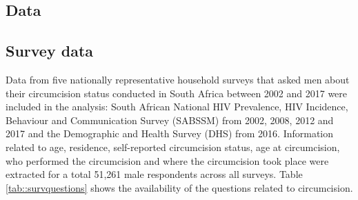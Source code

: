 \documentclass{article}
\begin{document}
\begin{appendix}

\section{Data}


\subsection{Survey data}


\noindent Data from five nationally representative household surveys that asked men about their circumcision status conducted in South Africa between 2002 and 2017 were included in the analysis: South African National HIV Prevalence, HIV Incidence, Behaviour and Communication Survey (SABSSM) from 2002, 2008, 2012 and 2017 and the Demographic and Health Survey (DHS) from 2016. Information related to age, residence, self-reported circumcision status, age at circumcision, who performed the circumcision and where the circumcision took place were extracted for a total 51,261 male respondents across all surveys. Table \ref{tab::survquestions} shows the availability of the questions related to circumcision.


\end{appendix}
\end{document}
